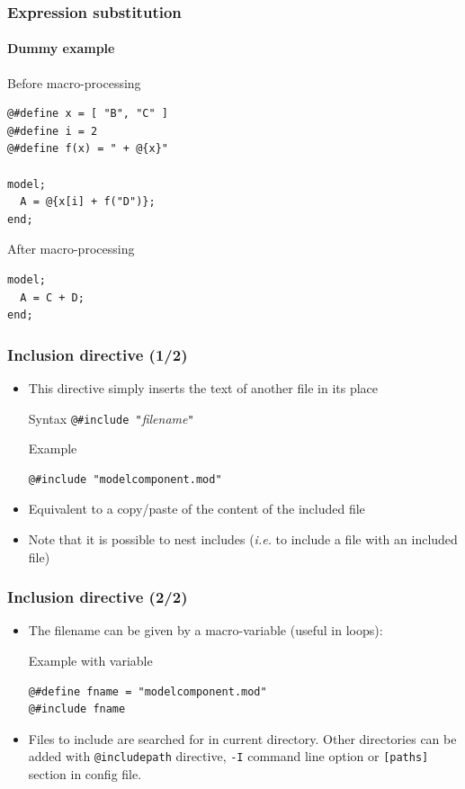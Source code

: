 \documentclass{beamer}
\begin{document}
\begin{frame}[fragile=singleslide]
  \frametitle{Expression substitution}
  \framesubtitle{Dummy example}
  \begin{block}{Before macro-processing}
\begin{verbatim}
@#define x = [ "B", "C" ]
@#define i = 2
@#define f(x) = " + @{x}"

model;
  A = @{x[i] + f("D")};
end;
\end{verbatim}
  \end{block}
  \begin{block}{After macro-processing}
\begin{verbatim}
model;
  A = C + D;
end;
\end{verbatim}
  \end{block}
\end{frame}

\begin{frame}[fragile=singleslide]
  \frametitle{Inclusion directive (1/2)}
  \begin{itemize}
  \item This directive simply inserts the text of another file in its place
    \begin{block}{Syntax}
      \verb+@#include "+\textit{filename}\verb+"+
    \end{block}
    \begin{block}{Example}
\begin{verbatim}
@#include "modelcomponent.mod"
\end{verbatim}
    \end{block}
  \item Equivalent to a copy/paste of the content of the included file
  \item Note that it is possible to nest includes (\textit{i.e.} to include a
    file with an included file)
  \end{itemize}
\end{frame}

\begin{frame}[fragile=singleslide]
  \frametitle{Inclusion directive (2/2)}
  \begin{itemize}
\item The filename can be given by a macro-variable (useful in loops):
    \begin{block}{Example with variable}
\begin{verbatim}
@#define fname = "modelcomponent.mod"
@#include fname
\end{verbatim}
    \end{block}
  \item Files to include are searched for in current directory. Other directories can
    be added with
    \texttt{@includepath} directive, \texttt{-I} command line option or
    \texttt{[paths]} section in config file.
  \end{itemize}
\end{frame}
\end{document}
